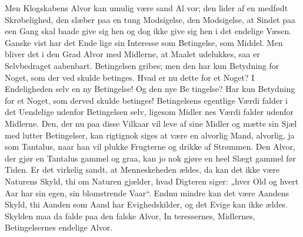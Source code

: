 \documentclass[12pt]{book}
\begin{document}
Men Klogskabens Alvor kan umulig være sand Al\-%
vor; den lider af en medfødt Skrøbelighed, den slæber
paa en tung Modsigelse, den Modsigelse, at Sindet paa
een Gang skal baade give sig hen og dog ikke give sig
hen i det endelige Væsen. Ganske vist har det Ende\-%
lige sin Interesse som Betingelse, som Middel. Men
bliver det i den Grad Alvor med Midlerne, at Maalet
udelukkes, saa er Selvbedraget aabenbart. Betingelsen
gribes; men den har kun Betydning for Noget, som der\-%
ved skulde betinges. Hvad er nu dette for et Noget?
I Endeligheden selv en ny Betingelse! Og den nye Be\-%
tingelse? Har kun Betydning for et Noget, som derved
skulde betinges! Betingelsens egentlige Værdi falder i
det Uendelige udenfor Betingelsen selv, ligesom Midler\-%
nes Værdi falder udenfor Midlerne. Den, der nu paa
disse Vilkaar vil leve af sine Midler og mætte sin Sjæl
med lutter Betingelser, kan rigtignok siges at være en
alvorlig Mand, alvorlig, ja som Tantalus, naar han vil
plukke Frugterne og drikke af Strømmen. Den Alvor,
der gjør en Tantalus gammel og graa, kan jo nok gjøre
en heel Slægt gammel før Tiden. Er det virkelig sandt,
at Menneskeheden ældes, da kan det ikke være Naturens
Skyld, thi om Naturen gjælder, hvad Digteren siger:
„hver Old og hvert Aar har sin egen, sin blomstrende Vaar“.
Endnu mindre kan det være Aandens Skyld, thi Aanden
som Aand har Evighedskilder, og det Evige kan ikke
ældes. Skylden maa da falde paa den falske Alvor, In\-%
teressernes, Midlernes, Betingelsernes endelige Alvor.
\end{document}
